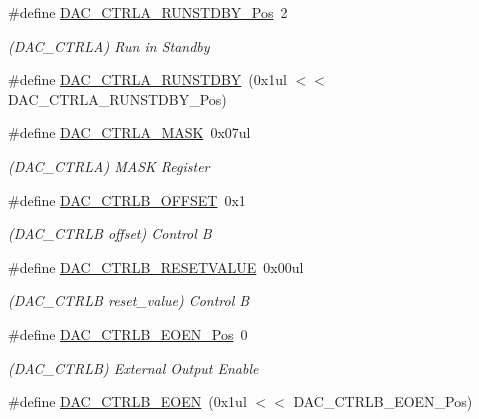 \begin{DoxyCompactItemize}
\item 
\#define \mbox{\hyperlink{group___s_a_m_d21___d_a_c_gabdf461e8ca3765359a3e350ff50cfd05}{D\+A\+C\+\_\+\+C\+T\+R\+L\+A\+\_\+\+R\+U\+N\+S\+T\+D\+B\+Y\+\_\+\+Pos}}~2
\begin{DoxyCompactList}\small\item\em (D\+A\+C\+\_\+\+C\+T\+R\+LA) Run in Standby \end{DoxyCompactList}\item 
\#define \mbox{\hyperlink{group___s_a_m_d21___d_a_c_ga601cdcfdd1fb4fae7de0c3ac96b6a9a2}{D\+A\+C\+\_\+\+C\+T\+R\+L\+A\+\_\+\+R\+U\+N\+S\+T\+D\+BY}}~(0x1ul $<$$<$ D\+A\+C\+\_\+\+C\+T\+R\+L\+A\+\_\+\+R\+U\+N\+S\+T\+D\+B\+Y\+\_\+\+Pos)
\item 
\#define \mbox{\hyperlink{group___s_a_m_d21___d_a_c_ga3194764eec2b07936137bbd3afbde5d2}{D\+A\+C\+\_\+\+C\+T\+R\+L\+A\+\_\+\+M\+A\+SK}}~0x07ul
\begin{DoxyCompactList}\small\item\em (D\+A\+C\+\_\+\+C\+T\+R\+LA) M\+A\+SK Register \end{DoxyCompactList}\item 
\#define \mbox{\hyperlink{group___s_a_m_d21___d_a_c_ga77355709810c770d457b0206b73e12c2}{D\+A\+C\+\_\+\+C\+T\+R\+L\+B\+\_\+\+O\+F\+F\+S\+ET}}~0x1
\begin{DoxyCompactList}\small\item\em (D\+A\+C\+\_\+\+C\+T\+R\+LB offset) Control B \end{DoxyCompactList}\item 
\#define \mbox{\hyperlink{group___s_a_m_d21___d_a_c_gac2138055bf74ac2fccda007458cdca1d}{D\+A\+C\+\_\+\+C\+T\+R\+L\+B\+\_\+\+R\+E\+S\+E\+T\+V\+A\+L\+UE}}~0x00ul
\begin{DoxyCompactList}\small\item\em (D\+A\+C\+\_\+\+C\+T\+R\+LB reset\+\_\+value) Control B \end{DoxyCompactList}\item 
\#define \mbox{\hyperlink{group___s_a_m_d21___d_a_c_gac43fc445d046c2264721fe11789800c9}{D\+A\+C\+\_\+\+C\+T\+R\+L\+B\+\_\+\+E\+O\+E\+N\+\_\+\+Pos}}~0
\begin{DoxyCompactList}\small\item\em (D\+A\+C\+\_\+\+C\+T\+R\+LB) External Output Enable \end{DoxyCompactList}\item 
\#define \mbox{\hyperlink{group___s_a_m_d21___d_a_c_ga8499370d0bd9518c965fe89af94add46}{D\+A\+C\+\_\+\+C\+T\+R\+L\+B\+\_\+\+E\+O\+EN}}~(0x1ul $<$$<$ D\+A\+C\+\_\+\+C\+T\+R\+L\+B\+\_\+\+E\+O\+E\+N\+\_\+\+Pos)

\end{DoxyCompactItemize}
